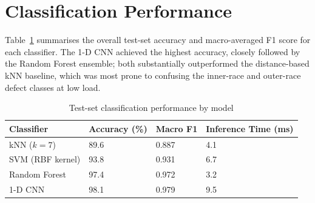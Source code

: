 \section{Classification Performance}
Table~\ref{tab:results} summarises the overall test-set accuracy and macro-averaged F1 score for
each classifier. The 1-D CNN achieved the highest accuracy, closely followed by the Random
Forest ensemble; both substantially outperformed the distance-based kNN baseline, which was most
prone to confusing the inner-race and outer-race defect classes at low load.

\begin{table}[!ht]
\centering
\caption{Test-set classification performance by model}
\label{tab:results}
\begin{tabularx}{\textwidth}{@{}l X X X@{}}
\toprule
\textbf{Classifier} & \textbf{Accuracy (\%)} & \textbf{Macro F1} & \textbf{Inference Time (ms)} \\
\midrule
kNN ($k=7$)          & 89.6 & 0.887 & 4.1  \\
SVM (RBF kernel)      & 93.8 & 0.931 & 6.7  \\
\rowcolor{dtugray} Random Forest & 97.4 & 0.972 & 3.2  \\
1-D CNN               & 98.1 & 0.979 & 9.5  \\
\bottomrule
\end{tabularx}
\end{table}
